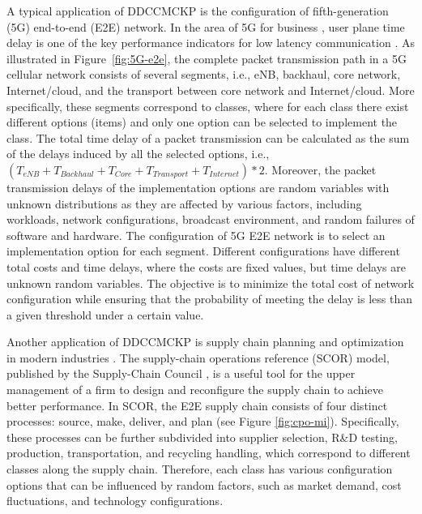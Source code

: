\documentclass[lettersize,journal]{IEEEtran}
\begin{document}
A typical application of DDCCMCKP is the configuration of fifth-generation (5G) end-to-end (E2E) network.
In the area of 5G for business \cite{nasrallah2018ultra}, user plane time delay is one of the key performance indicators for low latency communication \cite{5g2017view,parvez2018survey}.
As illustrated in Figure~\ref{fig:5G-e2e}, the complete packet transmission path in a 5G cellular network consists of several segments, i.e., eNB, backhaul, core network, Internet/cloud, and the transport between core network and Internet/cloud.
More specifically, these segments correspond to classes, where for each class there exist different options (items) and only one option can be selected to implement the class.
The total time delay of a packet transmission can be calculated as the sum of the delays induced by all the selected options, i.e., $(T_{eNB}+T_{Backhaul}+T_{Core}+T_{Transport}+T_{Internet})*2$.
Moreover,  the packet transmission delays of the implementation options are random variables with unknown distributions as they are affected by various factors, including workloads, network configurations, broadcast environment, and random failures of software and hardware.
The configuration of 5G E2E network is to select an implementation option for each segment.
Different configurations have different total costs and time delays, where the costs are fixed values, but time delays are unknown random variables.
The objective is to minimize the total cost of network configuration while ensuring that the probability of meeting the delay is less than a given threshold under a certain value.

Another application of DDCCMCKP is supply chain planning and optimization in modern industries \cite{sharkey2011class, taaffe2008target}.
The supply-chain operations reference (SCOR) model, published by the Supply-Chain Council \cite{huan2004review}, is a useful tool for the upper management of a firm to design and reconfigure the supply chain to achieve better performance.
In SCOR, the E2E supply chain consists of four distinct processes: source, make, deliver, and plan (see Figure \ref{fig:cpo-mi}). Specifically, these processes can be further subdivided into supplier selection, R\&D testing, production, transportation, and recycling handling, which correspond to different classes along the supply chain. Therefore, each class has various configuration options that can be influenced by random factors, such as market demand, cost fluctuations, and technology configurations.
\end{document}
